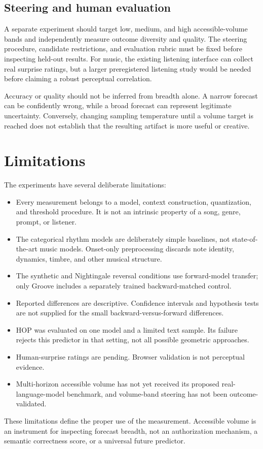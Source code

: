 \documentclass[11pt,a4paper]{article}
\begin{document}
\subsection{Steering and human evaluation}
A separate experiment should target low, medium, and high accessible-volume bands and independently measure outcome diversity and quality. The steering procedure, candidate restrictions, and evaluation rubric must be fixed before inspecting held-out results. For music, the existing listening interface can collect real surprise ratings, but a larger preregistered listening study would be needed before claiming a robust perceptual correlation.

Accuracy or quality should not be inferred from breadth alone. A narrow forecast can be confidently wrong, while a broad forecast can represent legitimate uncertainty. Conversely, changing sampling temperature until a volume target is reached does not establish that the resulting artifact is more useful or creative.

\section{Limitations}
The experiments have several deliberate limitations:
\begin{itemize}[nosep]
  \item Every measurement belongs to a model, context construction, quantization, and threshold procedure. It is not an intrinsic property of a song, genre, prompt, or listener.
  \item The categorical rhythm models are deliberately simple baselines, not state-of-the-art music models. Onset-only preprocessing discards note identity, dynamics, timbre, and other musical structure.
  \item The synthetic and Nightingale reversal conditions use forward-model transfer; only Groove includes a separately trained backward-matched control.
  \item Reported differences are descriptive. Confidence intervals and hypothesis tests are not supplied for the small backward-versus-forward differences.
  \item HOP was evaluated on one model and a limited text sample. Its failure rejects this predictor in that setting, not all possible geometric approaches.
  \item Human-surprise ratings are pending. Browser validation is not perceptual evidence.
  \item Multi-horizon accessible volume has not yet received its proposed real-language-model benchmark, and volume-band steering has not been outcome-validated.
\end{itemize}
These limitations define the proper use of the measurement. Accessible volume is an instrument for inspecting forecast breadth, not an authorization mechanism, a semantic correctness score, or a universal future predictor.
\end{document}
